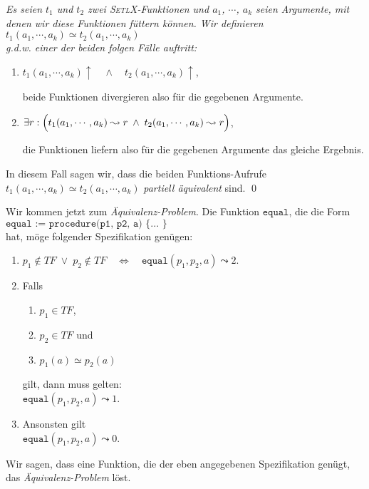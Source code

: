 \begin{Definition}[$\simeq$] 
{\em 
Es seien $t_1$ und $t_2$ zwei \textsc{SetlX}-Funktionen und
  $a_1$, $\cdots$, $a_k$ seien Argumente, mit denen wir diese Funktionen f\"{u}ttern k\"{o}nnen. Wir definieren \\[0.1cm]
\hspace*{1.3cm} $t_1(a_1,\cdots,a_k) \simeq t_2(a_1,\cdots,a_k)$ \\[0.1cm]
g.d.w. einer der beiden folgen F\"{a}lle auftritt:
\begin{enumerate}
\item $t_1(a_1,\cdots,a_k)\uparrow \quad\wedge\quad t_2(a_1,\cdots,a_k)\uparrow$,

      beide Funktionen divergieren also f\"{u}r die gegebenen Argumente.
\item $\exists r: \Bigl(t_1(a_1,\cdots,a_k) \leadsto r \;\wedge\; t_2(a_1,\cdots,a_k) \leadsto r\Bigr)$,

      die Funktionen liefern also f\"{u}r die gegebenen Argumente das gleiche Ergebnis.
\end{enumerate}
      In diesem Fall sagen wir, dass die beiden Funktions-Aufrufe 
      $t_1(a_1,\cdots,a_k) \simeq t_2(a_1,\cdots,a_k)$ \emph{partiell \"{a}quivalent} sind.  
      \qed
}
\end{Definition}

\noindent
Wir kommen jetzt zum \emph{\"{A}quivalenz-Problem}.  Die Funktion $\texttt{equal}$, die die Form
\\[0.2cm]
\hspace*{1.3cm}
$\texttt{equal := procedure(p1, p2, a) \{ ... \}}$
\\[0.2cm]
hat, m\"{o}ge folgender Spezifikation gen\"{u}gen:
\begin{enumerate}
\item $p_1 \not\in T\!F \;\vee\; p_2 \not\in T\!F \quad\Leftrightarrow\quad \mathtt{equal}(p_1, p_2, a) \leadsto 2$.
\item Falls 
  \begin{enumerate}
  \item $p_1 \in T\!F$,
  \item $p_2 \in T\!F$ \quad und
  \item $p_1(a) \simeq p_2(a)$
  \end{enumerate}
    gilt, dann muss gelten: \\[0.1cm]
   \hspace*{1.3cm}  $\mathtt{equal}(p_1, p_2, a) \leadsto 1$.
\item Ansonsten gilt \\[0.1cm]
      \hspace*{1.3cm} $\mathtt{equal}(p_1, p_2, a) \leadsto 0$.
\end{enumerate}
Wir sagen, dass eine Funktion, die der eben angegebenen Spezifikation gen\"{u}gt, das
\emph{\"{A}quivalenz-Problem} l\"{o}st.

